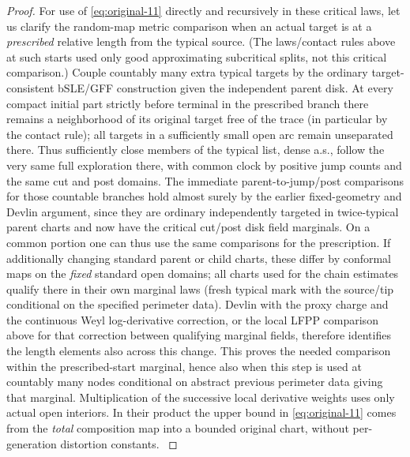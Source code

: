 \begin{proof}
For use of \eqref{eq:original-11} directly and recursively in these critical laws, let us clarify the random-map metric comparison when an actual target is at a \emph{prescribed} relative length from the typical source. (The laws/contact rules above at such starts used only good approximating subcritical splits, not this critical comparison.) Couple countably many extra typical targets by the ordinary target-consistent bSLE/GFF construction given the independent parent disk.
At every compact initial part strictly before terminal in the prescribed branch there remains a neighborhood of its original target free of the trace (in particular by the contact rule); all targets in a sufficiently small open arc remain unseparated there.
Thus sufficiently close members of the typical list, dense a.s., follow the very same full exploration there, with common clock by positive jump counts and the same cut and post domains.
The immediate parent-to-jump/post comparisons for those countable branches hold almost surely by the earlier fixed-geometry and Devlin argument, since they are ordinary independently targeted in twice-typical parent charts and now have the critical cut/post disk field marginals.
On a common portion one can thus use the same comparisons for the prescription.
If additionally changing standard parent or child charts, these differ by conformal maps on the \emph{fixed} standard open domains; all charts used for the chain estimates qualify there in their own marginal laws (fresh typical mark with the source/tip conditional on the specified perimeter data).
Devlin with the proxy charge and the continuous Weyl log-derivative correction, or the local LFPP comparison above for that correction between qualifying marginal fields, therefore identifies the length elements also across this change.
This proves the needed comparison within the prescribed-start marginal, hence also when this step is used at countably many nodes conditional on abstract previous perimeter data giving that marginal.
Multiplication of the successive local derivative weights uses only actual open interiors.
In their product the upper bound in \eqref{eq:original-11} comes from the \emph{total} composition map into a bounded original chart, without per-generation distortion constants. \citep{MSWTrunk,Devlin}

\end{proof}

